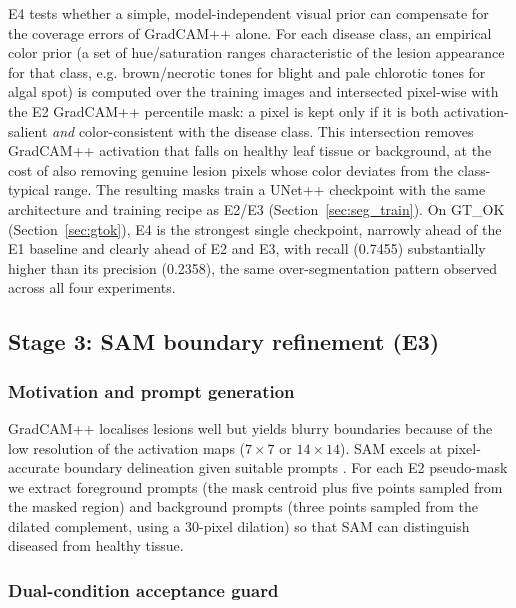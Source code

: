 \documentclass[final,5p,times,twocolumn,authoryear]{elsarticle}
\begin{document}
E4 tests whether a simple, model-independent visual prior can compensate for the coverage errors of GradCAM++ alone. For each disease class, an empirical color prior (a set of hue/saturation ranges characteristic of the lesion appearance for that class, e.g. brown/necrotic tones for blight and pale chlorotic tones for algal spot) is computed over the training images and intersected pixel-wise with the E2 GradCAM++ percentile mask: a pixel is kept only if it is both activation-salient \emph{and} color-consistent with the disease class. This intersection removes GradCAM++ activation that falls on healthy leaf tissue or background, at the cost of also removing genuine lesion pixels whose color deviates from the class-typical range. The resulting masks train a UNet++ checkpoint with the same architecture and training recipe as E2/E3 (Section~\ref{sec:seg_train}). On GT\_OK (Section~\ref{sec:gtok}), E4 is the strongest single checkpoint, narrowly ahead of the E1 baseline and clearly ahead of E2 and E3, with recall (0.7455) substantially higher than its precision (0.2358), the same over-segmentation pattern observed across all four experiments.

\subsection{Stage 3: SAM boundary refinement (E3)}
\label{sec:samguard}

\subsubsection{Motivation and prompt generation}

GradCAM++ localises lesions well but yields blurry boundaries because of the low resolution of the activation maps ($7\times7$ or $14\times14$). SAM excels at pixel-accurate boundary delineation given suitable prompts \citep{kirillov2023segment}. For each E2 pseudo-mask we extract foreground prompts (the mask centroid plus five points sampled from the masked region) and background prompts (three points sampled from the dilated complement, using a 30-pixel dilation) so that SAM can distinguish diseased from healthy tissue.

\subsubsection{Dual-condition acceptance guard}
\end{document}
